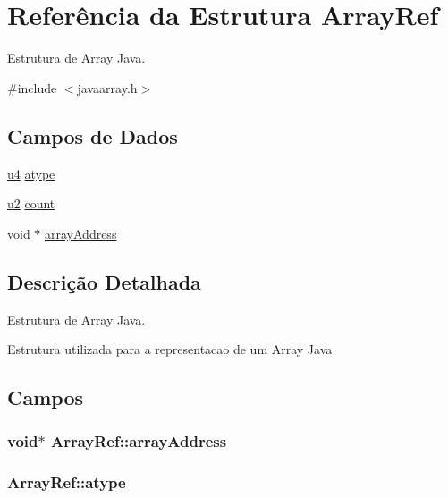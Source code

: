 \hypertarget{struct_array_ref}{}\section{Referência da Estrutura Array\+Ref}
\label{struct_array_ref}


Estrutura de Array Java.  




{\ttfamily \#include $<$javaarray.\+h$>$}

\subsection*{Campos de Dados}
\begin{DoxyCompactItemize}
\item 
\hyperlink{estruturas_8h_aedf6ddc03df8caaaccbb4c60b9a9b850}{u4} \hyperlink{struct_array_ref_a0517c4d135daa6329b39ea01e5c498d2}{atype}
\item 
\hyperlink{estruturas_8h_a5f223212eef04d10a4550ded680cb1cf}{u2} \hyperlink{struct_array_ref_abaaae2def8584a14b087e76d4308aec7}{count}
\item 
void $\ast$ \hyperlink{struct_array_ref_ae8d35b12d681e4e2a69f5f81358c0ec8}{array\+Address}
\end{DoxyCompactItemize}


\subsection{Descrição Detalhada}
Estrutura de Array Java. 

Estrutura utilizada para a representacao de um Array Java 

\subsection{Campos}
\subsubsection[{\texorpdfstring{array\+Address}{arrayAddress}}]{\setlength{\rightskip}{0pt plus 5cm}void$\ast$ Array\+Ref\+::array\+Address}\hypertarget{struct_array_ref_ae8d35b12d681e4e2a69f5f81358c0ec8}{}\label{struct_array_ref_ae8d35b12d681e4e2a69f5f81358c0ec8}
\subsubsection[{\texorpdfstring{atype}{atype}}]{ Array\+Ref\+::atype}\hypertarget{struct_array_ref_a0517c4d135daa6329b39ea01e5c498d2}{}\label{struct_array_ref_a0517c4d135daa6329b39ea01e5c498d2}
